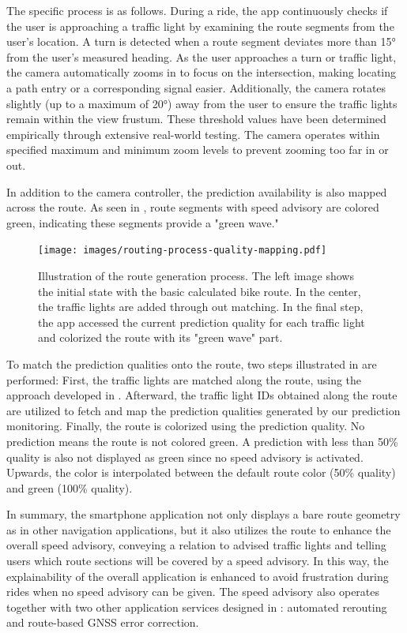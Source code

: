 The specific process is as follows. During a ride, the app continuously checks if the user is approaching a traffic light by examining the route segments from the user's location. A turn is detected when a route segment deviates more than 15° from the user's measured heading. As the user approaches a turn or traffic light, the camera automatically zooms in to focus on the intersection, making locating a path entry or a corresponding signal easier. Additionally, the camera rotates slightly (up to a maximum of 20°) away from the user to ensure the traffic lights remain within the view frustum. These threshold values have been determined empirically through extensive real-world testing. The camera operates within specified maximum and minimum zoom levels to prevent zooming too far in or out.

In addition to the camera controller, the prediction availability is also mapped across the route. As seen in , route segments with speed advisory are colored green, indicating these segments provide a "green wave." 

\begin{figure}[t]
\centering
\texttt{[image: images/routing-process-quality-mapping.pdf]}
\caption{Illustration of the route generation process. The left image shows the initial state with the basic calculated bike route. In the center, the traffic lights are added through out matching. In the final step, the app accessed the current prediction quality for each traffic light and colorized the route with its "green wave" part.}
\label{fig:routing-process-quality-mapping}
\end{figure}

To match the prediction qualities onto the route, two steps illustrated in  are performed: First, the traffic lights are matched along the route, using the approach developed in . Afterward, the traffic light IDs obtained along the route are utilized to fetch and map the prediction qualities generated by our prediction monitoring. Finally, the route is colorized using the prediction quality. No prediction means the route is not colored green. A prediction with less than 50\% quality is also not displayed as green since no speed advisory is activated. Upwards, the color is interpolated between the default route color (50\% quality) and green (100\% quality).

In summary, the smartphone application not only displays a bare route geometry as in other navigation applications, but it also utilizes the route to enhance the overall speed advisory, conveying a relation to advised traffic lights and telling users which route sections will be covered by a speed advisory. In this way, the explainability of the overall application is enhanced to avoid frustration during rides when no speed advisory can be given. The speed advisory also operates together with two other application services designed in : automated rerouting and route-based GNSS error correction.


